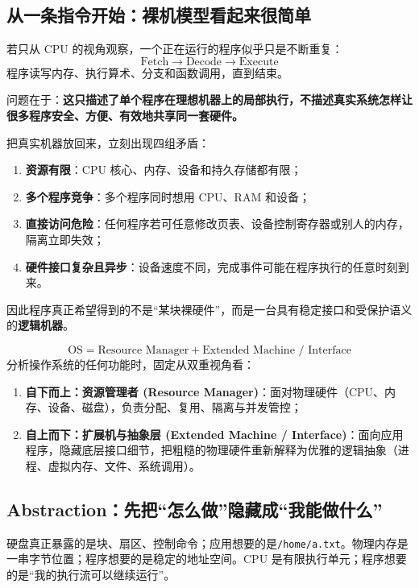 \documentclass[11pt,a4paper]{ctexart}
\newcommand{\kw}[1]{\textbf{#1}}
\newcommand{\code}[1]{\texttt{#1}}
\begin{document}
\subsection{从一条指令开始：裸机模型看起来很简单}

若只从 CPU 的视角观察，一个正在运行的程序似乎只是不断重复：
\[
\boxed{\text{Fetch}\rightarrow\text{Decode}\rightarrow\text{Execute}}
\]
程序读写内存、执行算术、分支和函数调用，直到结束。

问题在于：\kw{这只描述了单个程序在理想机器上的局部执行，不描述真实系统怎样让很多程序安全、方便、有效地共享同一套硬件。}

把真实机器放回来，立刻出现四组矛盾：

\begin{enumerate}
  \item \kw{资源有限}：CPU 核心、内存、设备和持久存储都有限；
  \item \kw{多个程序竞争}：多个程序同时想用 CPU、RAM 和设备；
  \item \kw{直接访问危险}：任何程序若可任意修改页表、设备控制寄存器或别人的内存，隔离立即失效；
  \item \kw{硬件接口复杂且异步}：设备速度不同，完成事件可能在程序执行的任意时刻到来。
\end{enumerate}

因此程序真正希望得到的不是“某块裸硬件”，而是一台具有稳定接口和受保护语义的\kw{逻辑机器}。

\begin{corebox}
\[
\boxed{
\text{OS} = \text{Resource Manager} + \text{Extended Machine / Interface}
}
\]
分析操作系统的任何功能时，固定从双重视角看：
\begin{enumerate}
  \item \kw{自下而上：资源管理者 (Resource Manager)}：面对物理硬件（CPU、内存、设备、磁盘），负责分配、复用、隔离与并发管控；
  \item \kw{自上而下：扩展机与抽象层 (Extended Machine / Interface)}：面向应用程序，隐藏底层接口细节，把粗糙的物理硬件重新解释为优雅的逻辑抽象（进程、虚拟内存、文件、系统调用）。
\end{enumerate}
\end{corebox}

\subsection{Abstraction：先把“怎么做”隐藏成“我能做什么”}

硬盘真正暴露的是块、扇区、控制命令；应用想要的是\code{/home/a.txt}。物理内存是一串字节位置；程序想要的是稳定的地址空间。CPU 是有限执行单元；程序想要的是“我的执行流可以继续运行”。
\end{document}
